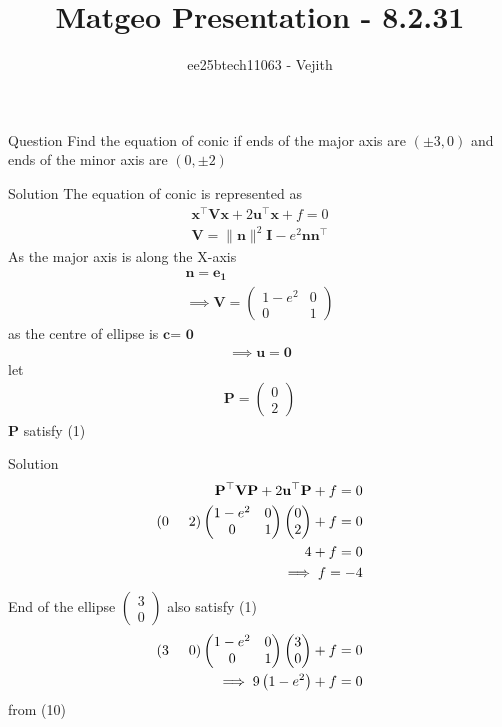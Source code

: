 \documentclass{beamer}
\title{Matgeo Presentation - 8.2.31}
\author{ee25btech11063 - Vejith}
\numberwithin{equation}{section}
\providecommand{\brak}[1]{\ensuremath{\left(#1\right)}}
\theoremstyle{remark}
\providecommand{\norm}[1]{\lVert#1\rVert}
\newcommand{\myvec}[1]{\ensuremath{\begin{pmatrix}#1\end{pmatrix}}}
\let\vec\mathbf
\begin{document}
\frame{\titlepage}
\begin{frame}{Question}
Find the equation of conic if ends of the major axis are \brak{\pm 3,0} and ends of the minor axis are  \brak{0,\pm 2}
\end{frame}

\begin{frame}{Solution}
    The equation of conic is represented as
\begin{align}
\vec{x}^\top\vec{V}\vec{x} + 2\vec{u}^\top\vec{x} + f = 0\\
\vec{V}=\norm{\vec{n}}^2\vec{I}-e^2\vec{n}\vec{n}^\top
\end{align}
As the major axis is along the X-axis 
\begin{align}
    \vec{n}=\vec{e_1}\\
    \implies \vec{V}=\begin{pmatrix}
        1-e^2 & 0\\
        0 & 1
    \end{pmatrix}
\end{align}
as the centre of ellipse is $\vec{c}$= $\vec{0}$
\begin{align}
    \implies \vec{u}=\vec{0}
\end{align}
let
\begin{align}
    \vec{P}=\myvec{0\\2}
\end{align}
$\vec{P}$  satisfy (1)
\end{frame}
\begin{frame}{Solution}
\begin{align}
    \vec{P}^\top\vec{V}\vec{P} + 2\vec{u}^\top\vec{P} + f = 0\\
    \brak{0\hspace{0.5cm} 2} \begin{pmatrix}
        1-e^2 & 0\\
        0 & 1
    \end{pmatrix}\myvec{0\\2} +f=0\\
     4+f=0 \\
     \implies f=-4
\end{align}
End of the ellipse $\myvec{3\\0}$ also satisfy (1)
\begin{align}
    \brak{3\hspace{0.5cm} 0} \begin{pmatrix}
        1-e^2 & 0\\
        0 & 1
    \end{pmatrix}\myvec{3\\0} +f=0\\
    \implies 9\brak{1-e^2}+f=0
\end{align}
from (10)
\end{frame}
\end{document}
